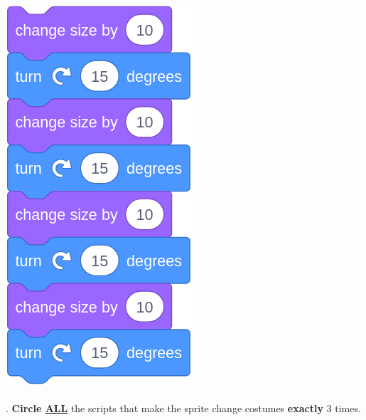 \documentclass[letterpaper,12pt]{article}
\begin{document}
\includegraphics[scale=.3,valign=t]{q2_script4.png} \hspace{1.25cm} \\

\noindent \dotfill \\

. \textbf{Circle \underline{ALL}} the scripts that make the sprite change costumes \textbf{exactly} 3 times. \\
\end{document}
